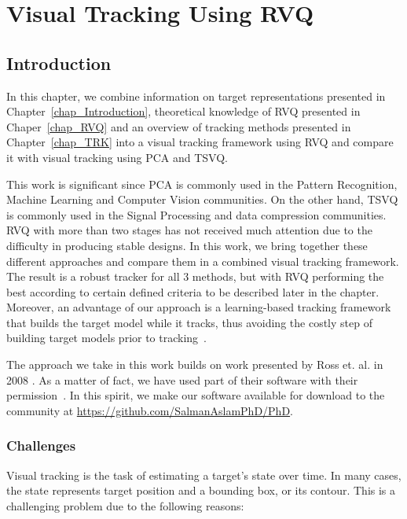 %
%
%

\chapter{Visual Tracking Using RVQ}
\label{chap_RVQ_TRK}	
\section{Introduction}
In this chapter, we combine information on target representations presented in Chapter~\ref{chap_Introduction}, theoretical knowledge of RVQ presented in Chaper~\ref{chap_RVQ} and an overview of tracking methods presented in Chapter~\ref{chap_TRK} into a visual tracking framework using RVQ and compare it with visual tracking using PCA and TSVQ.  

This work is significant since PCA is commonly used in the Pattern Recognition, Machine Learning and Computer Vision communities.  On the other hand, TSVQ is commonly used in the Signal Processing and data compression communities.  RVQ with more than two stages has not received much attention due to the difficulty in producing stable designs.  In this work, we bring together these different approaches and compare them in a combined visual tracking framework.  The result is a robust tracker for all 3 methods, but with RVQ performing the best according to certain defined criteria to be described later in the chapter.  Moreover, an advantage of our approach is a learning-based tracking framework that builds the target model while it tracks, thus avoiding the costly step of building target models prior to tracking~\cite{2004_JNL_SVMtracking_Avidan}.

The approach we take in this work builds on work presented by Ross et. al. in 2008 \cite{2008_JNL_subspaceTRK_Ross}.  As a matter of fact, we have used part of their software with their permission~\cite{2008_SFT_Ross}.  In this spirit, we make our software available for download to the community at \url{https://github.com/SalmanAslamPhD/PhD}.  

\subsection{Challenges}
Visual tracking is the task of estimating a target's state over time.  In many cases, the state represents target position and a bounding box, or its contour.  This is a challenging problem due to the following reasons:

